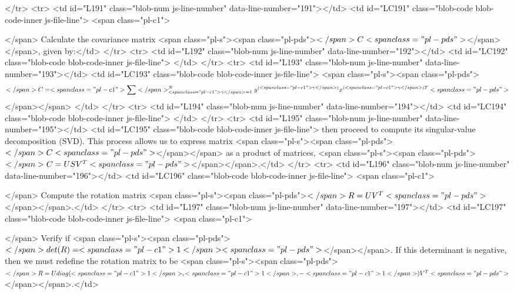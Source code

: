       </tr>
      <tr>
        <td id="L191" class="blob-num js-line-number" data-line-number="191"></td>
        <td id="LC191" class="blob-code blob-code-inner js-file-line">	<span class="pl-c1">\item</span> Calculate the covariance matrix <span class="pl-s"><span class="pl-pds">$</span>C<span class="pl-pds">$</span></span>, given by:</td>
      </tr>
      <tr>
        <td id="L192" class="blob-num js-line-number" data-line-number="192"></td>
        <td id="LC192" class="blob-code blob-code-inner js-file-line">	</td>
      </tr>
      <tr>
        <td id="L193" class="blob-num js-line-number" data-line-number="193"></td>
        <td id="LC193" class="blob-code blob-code-inner js-file-line">	<span class="pl-s"><span class="pl-pds">$$</span>C = <span class="pl-c1">\sum</span>_{<span class="pl-c1">\gamma</span>=1}^{N} y^{(<span class="pl-c1">\gamma</span>)}x^{(<span class="pl-c1">\gamma</span>)T}<span class="pl-pds">$$</span></span> </td>
      </tr>
      <tr>
        <td id="L194" class="blob-num js-line-number" data-line-number="194"></td>
        <td id="LC194" class="blob-code blob-code-inner js-file-line">	</td>
      </tr>
      <tr>
        <td id="L195" class="blob-num js-line-number" data-line-number="195"></td>
        <td id="LC195" class="blob-code blob-code-inner js-file-line">	then proceed to compute its singular-value decomposition (SVD). This process allows us to express matrix <span class="pl-s"><span class="pl-pds">$</span>C<span class="pl-pds">$</span></span> as a product of matrices, <span class="pl-s"><span class="pl-pds">$</span>C = USV^{T}<span class="pl-pds">$</span></span>.</td>
      </tr>
      <tr>
        <td id="L196" class="blob-num js-line-number" data-line-number="196"></td>
        <td id="LC196" class="blob-code blob-code-inner js-file-line">	<span class="pl-c1">\item</span> Compute the rotation matrix <span class="pl-s"><span class="pl-pds">$</span>R = UV^{T}<span class="pl-pds">$</span></span>.</td>
      </tr>
      <tr>
        <td id="L197" class="blob-num js-line-number" data-line-number="197"></td>
        <td id="LC197" class="blob-code blob-code-inner js-file-line">	<span class="pl-c1">\item</span> Verify if <span class="pl-s"><span class="pl-pds">$</span>det(R) = <span class="pl-c1">1</span><span class="pl-pds">$</span></span>. If this determinant is negative, then we must redefine the rotation matrix to be <span class="pl-s"><span class="pl-pds">$</span>R = Udiag(<span class="pl-c1">1</span>,<span class="pl-c1">1</span>,-<span class="pl-c1">1</span>)V^{T}<span class="pl-pds">$</span></span>.</td>

